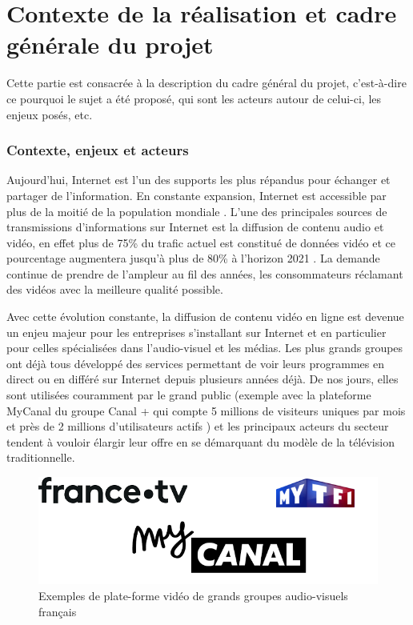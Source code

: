 \documentclass{polytech/polytech}
\begin{document}
\part{Contexte de la réalisation et cadre générale du projet}


Cette partie est consacrée à la description du cadre général du projet, c’est-à-dire ce pourquoi le sujet a été proposé, qui sont les acteurs autour de celui-ci, les enjeux posés, etc.


\section{Contexte, enjeux et acteurs}


Aujourd’hui, Internet est l’un des supports les plus répandus pour échanger et partager de l’information. En constante expansion, Internet est accessible par plus de la moitié de la population mondiale \cite{_chiffres_2017}. L’une des principales sources de transmissions d'informations sur Internet est la diffusion de contenu audio et vidéo, en effet plus de 75\% du trafic actuel est constitué de données vidéo et ce pourcentage augmentera jusqu’à plus de 80\% à l’horizon 2021 \cite{_cisco_2017}. La demande continue de prendre de l’ampleur au fil des années, les consommateurs réclamant des vidéos avec la meilleure qualité possible.

Avec cette évolution constante, la diffusion de contenu vidéo en ligne est devenue un enjeu majeur pour les entreprises s’installant sur Internet et en particulier pour celles spécialisées dans l’audio-visuel et les médias. Les plus grands groupes ont déjà tous développé des services permettant de voir leurs programmes en direct ou en différé sur Internet depuis plusieurs années déjà. De nos jours, elles sont utilisées couramment par le grand public (exemple avec la plateforme MyCanal du groupe Canal + qui compte 5 millions de visiteurs uniques par mois et près de 2 millions d’utilisateurs actifs \cite{sancerre_canal+_2017}) et les principaux acteurs du secteur tendent à vouloir élargir leur offre en se démarquant du modèle de la télévision traditionnelle.


\begin{figure}
	\includegraphics[scale=0.75]{images/exemple_sites.png}
	\caption{Exemples de plate-forme vidéo de grands groupes audio-visuels français}
	\label{fig:ex_plate-formes}
\end{figure}
\end{document}
